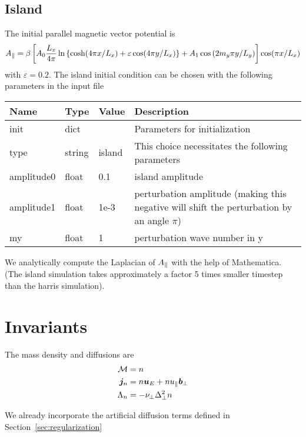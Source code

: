 \subsection{Island}
The initial parallel magnetic vector potential is
\begin{align}
    A_\parallel =\beta \left[ A_0\frac{L_x}{4\pi} \ln \left\{ \cosh( 4\pi x/L_x) + \varepsilon \cos( 4\pi y/L_x)\right\} + A_1\cos{(2m_y \pi y/L_y)}\right] \cos( \pi x /L_x)
\end{align}
with $\varepsilon = 0.2$.
The island initial condition can be chosen with the following parameters in the input file
\begin{longtable}{llll}
\toprule
\rowcolor{gray!50}\textbf{Name} &  \textbf{Type} & \textbf{Value}  & \textbf{Description}  \\ \midrule
init &  dict &   & Parameters for initialization \\
\qquad type      & string & island & This choice necessitates the following parameters \\
\qquad amplitude0  & float &  0.1     &  island amplitude \\
\qquad amplitude1  & float &  1e-3    &  perturbation amplitude (making this negative will shift the perturbation by an angle $\pi$) \\
\qquad my          & float &  1       &  perturbation wave number in y\\
\bottomrule
\end{longtable}
We analytically compute the Laplacian of $A_\parallel$ with the help of Mathematica.
(The island simulation takes approximately a factor 5 times smaller timestep than
the harris simulation).

\section{Invariants}
The mass density and diffusions are
\begin{align}
    \mathcal M &= n  \\
    {\boldsymbol{j}}_n &= n  {\boldsymbol{u}}_E + n u_\parallel {\boldsymbol{b}}_\perp \\
     \Lambda_n &= -\nu_\perp \Delta_\perp^2 n 
\end{align}
\begin{tcolorbox}[title=Note]
    We already incorporate the artificial diffusion terms defined in
    Section~\ref{sec:regularization}
\end{tcolorbox}

